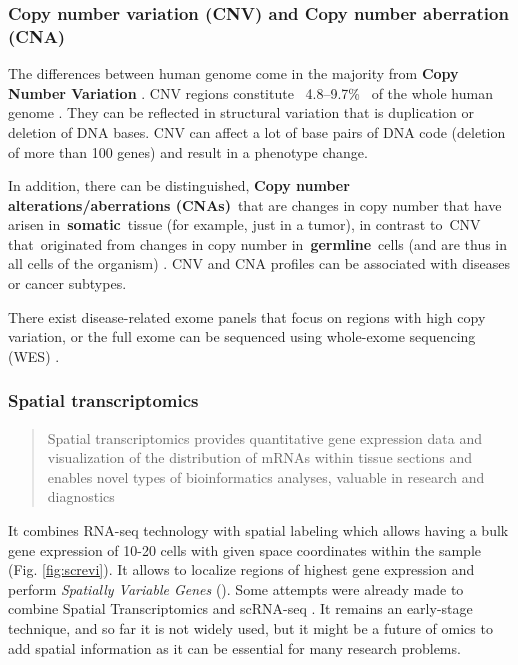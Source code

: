 \documentclass[12pt,]{book}
\theoremstyle{definition}
\theoremstyle{definition}
\theoremstyle{definition}
\theoremstyle{remark}
\begin{document}
\hypertarget{copy-number-variation-cnv-and-copy-number-aberration-cna}{%
\subsubsection{Copy number variation (CNV) and Copy number aberration
(CNA)}\label{copy-number-variation-cnv-and-copy-number-aberration-cna}}

The differences between human genome come in the majority from
\textbf{Copy Number Variation }\citep{McCarroll2007}. CNV regions
constitute ~4.8--9.7\%~ of the whole human genome \citep{Zarrei2015}.
They can be reflected in structural variation that is duplication or
deletion of DNA bases. CNV can affect a lot of base pairs of DNA code
(deletion of more than 100 genes) and result in a phenotype change.

In addition, there can be distinguished, \textbf{Copy number
alterations/aberrations (CNAs)}~that are changes in copy number that
have arisen in~\textbf{somatic}~tissue (for example, just in a tumor),
in contrast to~CNV that~originated from changes in copy number
in~\textbf{germline}~cells (and are thus in all cells of the organism)
\citep{McCarroll2007}. CNV and CNA profiles can be associated with
diseases or cancer subtypes.

There exist disease-related exome panels that focus on regions with high
copy variation, or the full exome can be sequenced using whole-exome
sequencing (WES) \citep{Yamamoto2016}.

\hypertarget{spatial-transcriptomics}{%
\subsubsection{Spatial transcriptomics}\label{spatial-transcriptomics}}

\begin{quote}
Spatial transcriptomics provides quantitative gene expression data and
visualization of the distribution of mRNAs within tissue sections and
enables novel types of bioinformatics analyses, valuable in research and
diagnostics \citep{Stahl2016}
\end{quote}

It combines RNA-seq technology with spatial labeling which allows having
a bulk gene expression of 10-20 cells with given space coordinates
within the sample (Fig. \ref{fig:screvi}). It allows to localize regions
of highest gene expression and perform \emph{Spatially Variable Genes}
(\citet{Svensson2018}). Some attempts were already made to combine
Spatial Transcriptomics and scRNA-seq \citep{Moncada2018}. It remains an
early-stage technique, and so far it is not widely used, but it might be
a future of omics to add spatial information as it can be essential for
many research problems.
\end{document}
